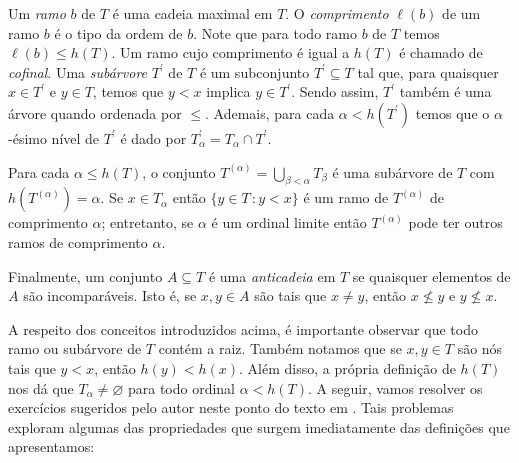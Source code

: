 \documentclass[a4paper]{article}
\begin{document}
Um \emph{ramo} \(b\) de \(T\) é uma cadeia maximal em \(T\).  O \emph{comprimento}
\(\ell(b)\) de um ramo \(b\) é o tipo da ordem de \(b\). Note que para
todo ramo \(b\) de \(T\) temos \(\ell (b)\leq h(T)\).
Um ramo cujo comprimento é igual a \(h(T)\) é chamado de \emph{cofinal}.
Uma \emph{subárvore} \(T^\prime\) de \(T\) é um subconjunto
\(T^\prime\subseteq T\) tal que, para quaisquer \(x\in T^\prime\) e \(y\in T\),
temos que \(y<x\) implica \(y\in T^\prime\).
Sendo assim, \(T^\prime\) também é uma árvore quando ordenada por \(\leq\).
Ademais, para cada \(\alpha < h(T^\prime)\) temos que o \(\alpha\)-ésimo nível
de \(T^\prime\) é dado por \(T_\alpha^\prime= T_\alpha \cap T^\prime\).

 Para cada \(\alpha\leq h(T)\), o conjunto \(T^{(\alpha)}=\bigcup_{\beta <
   \alpha} T_\beta\) é uma subárvore de \(T\) com  \(h(T^{(\alpha)})=\alpha\).
 Se \(x\in T_\alpha\) então \(\{y\in T\,\colon y < x\}\) é um ramo de \(T^{(\alpha)}\) de
comprimento \(\alpha\); entretanto, se \(\alpha\) é um ordinal limite então
\(T^{(\alpha)}\) pode ter outros ramos de comprimento \(\alpha\).

Finalmente, um conjunto \(A\subseteq T\) é uma \emph{anticadeia} em \(T\) se
quaisquer elementos de \(A\) são incomparáveis. Isto é, se \(x,y\in A\) são tais
que \(x\not = y\), então \(x\not \leq y\) e \(y\not \leq x\).

A respeito dos conceitos introduzidos acima, é importante observar que todo
ramo ou subárvore de \(T\) contém a raiz. Também notamos que se \(x,y\in T\)
são nós tais que \(y< x\), então \(h(y) <h(x)\). Além disso, a própria definição
de \(h(T)\) nos dá que \(T_\alpha\not=\varnothing\) para todo ordinal
\(\alpha<h(T)\). A seguir, vamos resolver os
exercícios sugeridos pelo autor neste ponto do texto em \cite{jech}. Tais problemas
exploram algumas das propriedades que surgem imediatamente das
definições que apresentamos:
\end{document}

